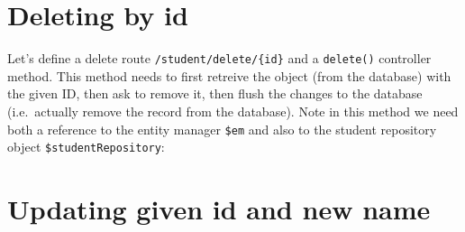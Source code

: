 \documentclass[a4paperpaper,openright]{book}
\newenvironment{Shaded}{}{}
\newcommand{\CommentTok}[1]{\textcolor[rgb]{0.38,0.63,0.69}{\textit{#1}}}
\newcommand{\FunctionTok}[1]{\textcolor[rgb]{0.02,0.16,0.49}{#1}}
\newcommand{\KeywordTok}[1]{\textcolor[rgb]{0.00,0.44,0.13}{\textbf{#1}}}
\newcommand{\NormalTok}[1]{#1}
\newcommand{\OtherTok}[1]{\textcolor[rgb]{0.00,0.44,0.13}{#1}}
\newcommand{\StringTok}[1]{\textcolor[rgb]{0.25,0.44,0.63}{#1}}
\begin{document}
\hypertarget{deleting-by-id}{%
\section{Deleting by id}\label{deleting-by-id}}

Let's define a delete route \texttt{/student/delete/\{id\}} and a
\texttt{delete()} controller method. This method needs to first retreive
the object (from the database) with the given ID, then ask to remove it,
then flush the changes to the database (i.e.~actually remove the record
from the database). Note in this method we need both a reference to the
entity manager \texttt{\$em} and also to the student repository object
\texttt{\$studentRepository}:

\begin{Shaded}
\end{Shaded}

\hypertarget{updating-given-id-and-new-name}{%
\section{Updating given id and new
name}\label{updating-given-id-and-new-name}}
\end{document}
